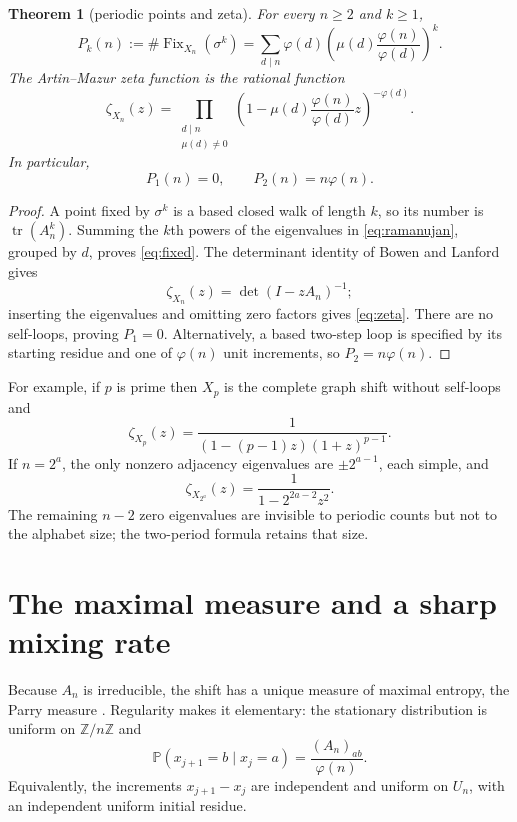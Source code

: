 \documentclass[11pt,a4paper]{amsart}
\newtheorem{theorem}{Theorem}[section]
\theoremstyle{definition}
\theoremstyle{remark}
\newcommand{\Z}{\mathbb Z}
\newcommand{\Fix}{\operatorname{Fix}}
\begin{document}
\begin{theorem}[periodic points and zeta]\label{thm:zeta}
For every $n\geq2$ and $k\geq1$,
\begin{equation}\label{eq:fixed}
 P_k(n):=\#\Fix_{X_n}(\sigma^k)
 =\sum_{d\mid n}\varphi(d)
 \left(\mu(d)\frac{\varphi(n)}{\varphi(d)}\right)^k.
\end{equation}
The Artin--Mazur zeta function is the rational function
\begin{equation}\label{eq:zeta}
 \zeta_{X_n}(z)
 =\prod_{\substack{d\mid n\\\mu(d)\ne0}}
 \left(1-\mu(d)\frac{\varphi(n)}{\varphi(d)}z\right)^{-\varphi(d)}.
\end{equation}
In particular,
\[
 P_1(n)=0,\qquad P_2(n)=n\varphi(n).
\]
\end{theorem}

\begin{proof}
A point fixed by $\sigma^k$ is a based closed walk of length $k$, so its
number is $\operatorname{tr}(A_n^k)$.  Summing the $k$th powers of the
eigenvalues in \eqref{eq:ramanujan}, grouped by $d$, proves
\eqref{eq:fixed}.  The determinant identity of Bowen and Lanford gives
\[
 \zeta_{X_n}(z)=\det(I-zA_n)^{-1};
\]
inserting the eigenvalues and omitting zero factors gives \eqref{eq:zeta}.
There are no self-loops, proving $P_1=0$.  Alternatively, a based two-step
loop is specified by its starting residue and one of $\varphi(n)$ unit
increments, so $P_2=n\varphi(n)$.
\end{proof}

For example, if $p$ is prime then $X_p$ is the complete graph shift without
self-loops and
\[
 \zeta_{X_p}(z)=\frac{1}{(1-(p-1)z)(1+z)^{p-1}}.
\]
If $n=2^a$, the only nonzero adjacency eigenvalues are
$\pm2^{a-1}$, each simple, and
\[
 \zeta_{X_{2^a}}(z)=\frac{1}{1-2^{2a-2}z^2}.
\]
The remaining $n-2$ zero eigenvalues are invisible to periodic counts but
not to the alphabet size; the two-period formula retains that size.

\section{The maximal measure and a sharp mixing rate}

Because $A_n$ is irreducible, the shift has a unique measure of maximal
entropy, the Parry measure \cite{Parry1964}.  Regularity makes it elementary:
the stationary distribution is uniform on $\Z/n\Z$ and
\begin{equation}\label{eq:transition}
 \mathbb P(x_{j+1}=b\mid x_j=a)
 =\frac{(A_n)_{ab}}{\varphi(n)}.
\end{equation}
Equivalently, the increments $x_{j+1}-x_j$ are independent and uniform on
$U_n$, with an independent uniform initial residue.
\end{document}

